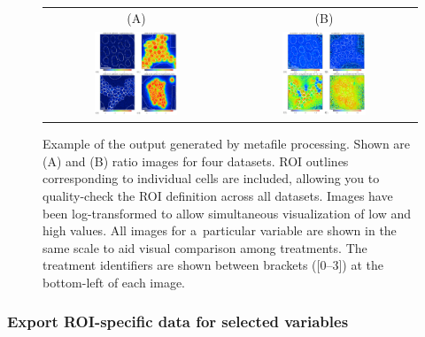 \begin{figure}[!ht]
\centering
\begin{tabular}{cc}
(A) & (B) \\
\includegraphics[width=0.47\textwidth, valign=t]{figs3/log(13C-(12C+13C))}
&
\includegraphics[width=0.47\textwidth, valign=t]{figs3/log(12C15N-(12C14N+12C15N))}
\end{tabular}
\caption{\label{fig:metafile-images}%
Example of the output generated by metafile processing. Shown are (A)  and (B)  ratio images for four datasets. ROI outlines corresponding to individual cells are included, allowing you to quality-check the ROI definition across all datasets. Images have been log-transformed to allow simultaneous visualization of low and high values. All images for a~particular variable are shown in the same scale to aid visual comparison among treatments. The treatment identifiers are shown between brackets ([0--3]) at the bottom-left of each image.}
\end{figure}


\subsubsection{Export ROI-specific data for selected variables}
\label{sec:622}
\setcounter{step}{0}

